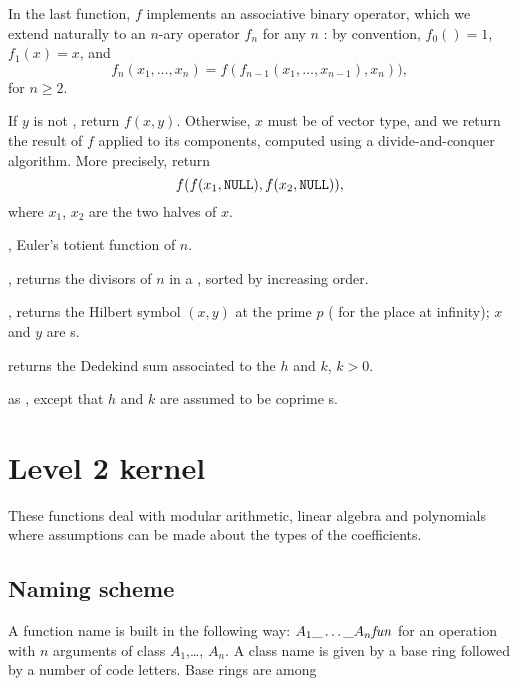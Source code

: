 


In the last function, $f$ implements an associative binary operator, which we
extend naturally to an $n$-ary operator $f_n$ for any $n$ : by convention,
$f_0() = 1$, $f_1(x) = x$, and
$$ f_n(x_1,\dots,x_n) = f( f_{n-1}(x_1,\dots,x_{n-1}), x_n)),$$
for $n \geq 2$.

 If $y$ is not
, return $f(x,y)$. Otherwise, $x$ must be of vector type, and we
return the result of $f$ applied to its components, computed using a
divide-and-conquer algorithm. More precisely, return
$$f( f(x_1,{\tt NULL}), f(x_2,{\tt NULL}) ),$$
where $x_1$, $x_2$ are the two halves of $x$.


, Euler's totient function of $n$.

, returns the divisors of $n$ in a
, sorted by increasing order.

, returns the Hilbert symbol
$(x,y)$ at the prime $p$ ( for the place at infinity); $x$ and $y$
are s.

 returns the Dedekind sum associated to
the  $h$ and $k$, $k > 0$.

 as , except
that $h$ and $k$ are assumed to be coprime s.

\newpage
\chapter{Level 2 kernel}

These functions deal with modular arithmetic, linear algebra and polynomials
where assumptions can be made about the types of the coefficients.

\section{Naming scheme}\label{se:level2names}
A function name is built in the following way:
$A_1{\tt \_}\dots{\tt \_}A_n\hbox{\it fun\/}$ for an operation  with $n$
arguments of class $A_1$,\dots, $A_n$. A class name is given by a base ring
followed by a number of code letters. Base rings are among

